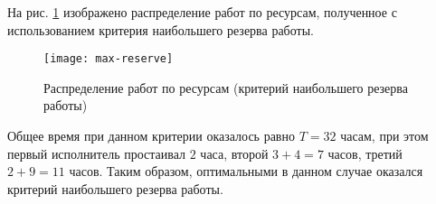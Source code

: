 \newpage

На рис. \ref{fig:max-reserve} изображено распределение работ по ресурсам, полученное с использованием критерия наибольшего резерва работы.

\begin{figure}[H]
	\begin{center}
		\texttt{[image: max-reserve]}
		\caption{Распределение работ по ресурсам (критерий наибольшего резерва работы)}
		\label{fig:max-reserve}
	\end{center}
\end{figure}

Общее время при данном критерии оказалось равно $T = 32$ часам, при этом первый исполнитель простаивал $2$ часа, второй $3 + 4 = 7$ часов, третий $2 + 9 = 11$ часов. Таким образом, оптимальными в данном случае оказался критерий наибольшего резерва работы.

